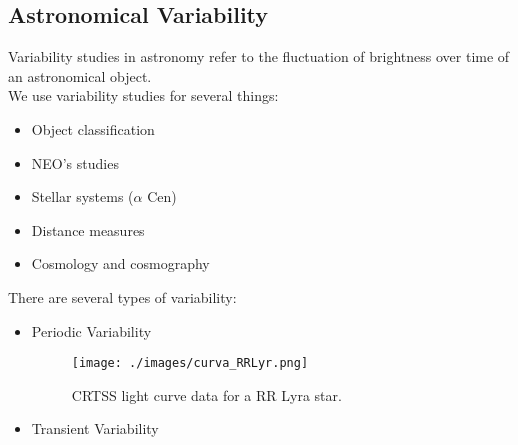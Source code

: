 \documentclass[10pt]{beamer}
\begin{document}
\subsection{Astronomical Variability}
\begin{frame}
Variability studies in astronomy refer to the fluctuation of brightness over time
of an astronomical object.\\ 
\bigskip
We use variability studies for several things:
\begin{itemize}
\item Object classification 
\item NEO's studies
\item Stellar systems ($\alpha$ Cen)
\item Distance measures
\item Cosmology and cosmography
\end{itemize}
\end{frame}
\begin{frame}
There are several types of variability:
\begin{itemize}[<+->]
 \item Periodic Variability
  {\begin{figure}[h] %
  \begin{center}
 \texttt{[image: ./images/curva\_RRLyr.png]}
\end{center}

 \caption{\scriptsize{CRTSS light curve data for a RR Lyra star. }}
\end{figure}}
 \item Transient Variability
\end{itemize}
\end{frame}
\end{document}
